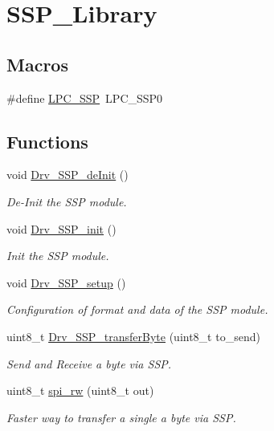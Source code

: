 \hypertarget{group__SSP__Library}{}\section{S\+S\+P\+\_\+\+Library}
\label{group__SSP__Library}
\subsection*{Macros}
\begin{DoxyCompactItemize}
\item 
\#define \hyperlink{group__SSP__Library_ga3e1177fbcbb4d87f0a2391e59042a5fc}{L\+P\+C\+\_\+\+S\+SP}~L\+P\+C\+\_\+\+S\+S\+P0
\end{DoxyCompactItemize}
\subsection*{Functions}
\begin{DoxyCompactItemize}
\item 
void \hyperlink{group__SSP__Library_ga564dfbd00e01e9e2f7e5cb1537b46db6}{Drv\+\_\+\+S\+S\+P\+\_\+de\+Init} ()
\begin{DoxyCompactList}\small\item\em De-\/\+Init the S\+SP module. \end{DoxyCompactList}\item 
void \hyperlink{group__SSP__Library_ga0c5eb23f106efe0d4b8687874954c549}{Drv\+\_\+\+S\+S\+P\+\_\+init} ()
\begin{DoxyCompactList}\small\item\em Init the S\+SP module. \end{DoxyCompactList}\item 
void \hyperlink{group__SSP__Library_ga0f01059c0a84ecf456f3ad9d38b9794b}{Drv\+\_\+\+S\+S\+P\+\_\+setup} ()
\begin{DoxyCompactList}\small\item\em Configuration of format and data of the S\+SP module. \end{DoxyCompactList}\item 
uint8\+\_\+t \hyperlink{group__SSP__Library_ga785ce7239c2c42f4a871322b9cff56b7}{Drv\+\_\+\+S\+S\+P\+\_\+transfer\+Byte} (uint8\+\_\+t to\+\_\+send)
\begin{DoxyCompactList}\small\item\em Send and Receive a byte via S\+SP. \end{DoxyCompactList}\item 
uint8\+\_\+t \hyperlink{group__SSP__Library_ga3808c285915bc0c410f4188eafce502d}{spi\+\_\+rw} (uint8\+\_\+t out)
\begin{DoxyCompactList}\small\item\em Faster way to transfer a single a byte via S\+SP. \end{DoxyCompactList}\end{DoxyCompactItemize}


